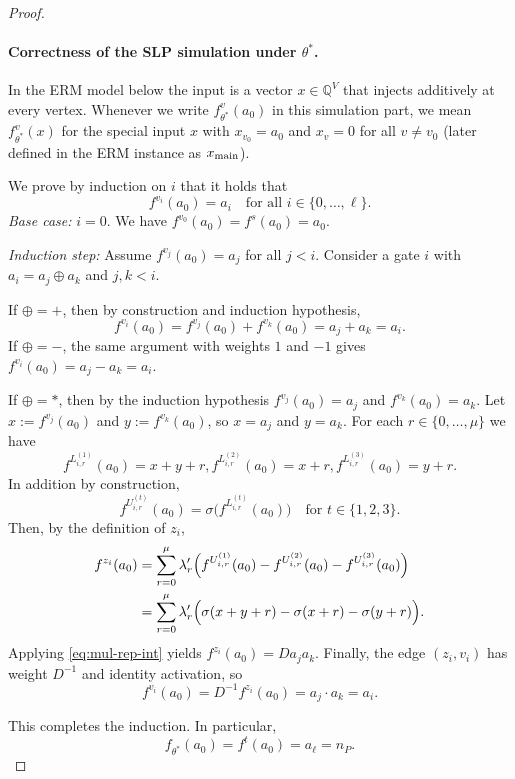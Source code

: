 \documentclass{article}
\newcommand{\Q}{\mathbb{Q}}
\theoremstyle{plain}
\theoremstyle{definition}
\theoremstyle{remark}
\begin{document}
\begin{proof}
	\paragraph{Correctness of the SLP simulation under $\theta^\ast$.}
	In the ERM model below the input is a vector $x\in\Q^{V}$ that injects additively at every vertex.
	Whenever we write $f^v_{\theta^\ast}(a_0)$ in this simulation part, we mean
	$f^v_{\theta^\ast}(x)$ for the special input $x$ with $x_{v_0}=a_0$ and $x_v=0$ for all $v\neq v_0$ (later defined in the ERM instance as $x_{\textnormal{main}}$).
	
	We prove by induction on $i$ that it holds that
	\[
	f^{v_i}(a_0) = a_i \quad\text{for all } i\in\{0,\dots,\ell\}.
	\]
	\emph{Base case:} $i=0$. We have $f^{v_0}(a_0)=f^s(a_0)=a_0$.
	
	\emph{Induction step:} Assume $f^{v_j}(a_0)=a_j$ for all $j<i$. Consider a
	gate $i$ with $a_i = a_j \oplus a_k$ and $j,k<i$.
	
	If $\oplus=+$, then by construction and induction hypothesis,
	\[
	f^{v_i}(a_0)
	= f^{v_j}(a_0) + f^{v_k}(a_0)
	= a_j + a_k = a_i.
	\]
	If $\oplus=-$, the same argument with weights $1$ and $-1$ gives
	$f^{v_i}(a_0)=a_j-a_k=a_i$.
	
	If $\oplus=*$, then by the induction hypothesis
	$f^{v_j}(a_0)=a_j$ and $f^{v_k}(a_0)=a_k$. Let $x:=f^{v_j}(a_0)$ and
	$y:=f^{v_k}(a_0)$, so $x=a_j$ and $y=a_k$. For each $r \in \{0,\ldots,{\mu}\}$ we have
	\[
	f^{L^{(1)}_{i,r}}(a_0) = x+y+r,
	f^{L^{(2)}_{i,r}}(a_0) = x+r,
	f^{L^{(3)}_{i,r}}(a_0) = y+r.
	\]
	In addition by construction,
	\[
	f^{U^{(t)}_{i,r}}(a_0)
	= \sigma\!\bigl(f^{L^{(t)}_{i,r}}(a_0)\bigr)
	\quad\text{for }t\in\{1,2,3\}.
	\]
	Then, by the definition of $z_i$,
	\begin{align*}
		f^{z_i}(a_0)
		&= \sum_{r=0}^{\mu} \lambda'_r\Bigl(
		f^{U^{(1)}_{i,r}}(a_0)
		- f^{U^{(2)}_{i,r}}(a_0)
		- f^{U^{(3)}_{i,r}}(a_0)
		\Bigr) \\
		&= \sum_{r=0}^{\mu} \lambda'_r\Bigl(
		\sigma(x+y+r) - \sigma(x+r) - \sigma(y+r)
		\Bigr).
	\end{align*}
	Applying \eqref{eq:mul-rep-int} yields
	$f^{z_i}(a_0) = D a_j a_k$. Finally, the edge $(z_i,v_i)$ has weight
	$D^{-1}$ and identity activation, so
	\[
	f^{v_i}(a_0) = D^{-1} f^{z_i}(a_0) = a_j \cdot a_k = a_i.
	\]
	
	This completes the induction. In particular,
	\begin{equation}
		\label{eq:scaled-output-new}
		f_{\theta^\ast}(a_0) = f^{t}(a_0) = a_\ell = n_P.
	\end{equation}
	

\end{proof}
\end{document}
